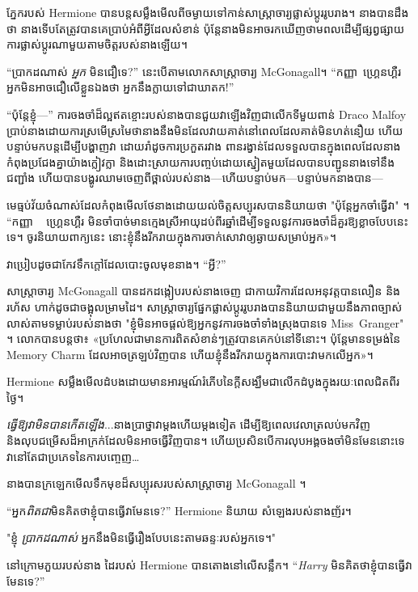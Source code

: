 ភ្នែករបស់ Hermione បានបន្តសម្លឹងមើលពីចម្ងាយទៅកាន់សាស្រ្តាចារ្យផ្លាស់ប្តូររូបរាង។ នាង​បាន​ដឹង​ថា នាង​ទើបតែ​ត្រូវ​បាន​គេ​ប្រាប់​អំពី​អ្វី​ដែល​សំខាន់ ប៉ុន្តែ​នាង​មិន​អាច​រក​ឃើញ​ថាមពល​ដើម្បី​ផ្សព្វផ្សាយ​ការ​ផ្លាស់​ប្តូរ​ណាមួយ​តាម​ចិត្ត​របស់​នាង​ឡើយ។

“ប្រាកដណាស់ \emph{អ្នក} មិនជឿទេ?” នេះ​បើ​តាម​លោក​សាស្ត្រាចារ្យ McGonagall។ “កញ្ញា~ហ្គ្រេនហ្គឺរ អ្នកមិនអាចជឿលើខ្លួនឯងថា អ្នកនឹងក្លាយទៅជាឃាតក!”

“ប៉ុន្តែខ្ញុំ—” ការចងចាំដ៏ល្អឥតខ្ចោះរបស់នាងបានជួយវាឡើងវិញជាលើកទីមួយពាន់ Draco Malfoy ប្រាប់នាងដោយការស្រមើស្រមៃថានាងនឹងមិនដែលវាយគាត់នៅពេលដែលគាត់មិនហត់នឿយ ហើយបន្ទាប់មកបន្តដើម្បីបង្ហាញវា ដោយរាំដូចការប្រកួតរវាង ពាន​រង្វាន់​ដែល​ទទួល​បាន​ក្នុង​ពេល​ដែល​នាង​កំពុង​ប្រជែង​គ្នា​យ៉ាង​ក្លៀវក្លា និង​ដោះស្រាយ​ការ​បញ្ចប់​ដោយ​ស្នៀត​មួយ​ដែល​បាន​បញ្ជូន​នាង​ទៅ​នឹង​ជញ្ជាំង ហើយ​បាន​បង្ហូរ​ឈាម​ចេញ​ពី​ថ្ពាល់​របស់​នាង—ហើយ​បន្ទាប់​មក—បន្ទាប់​មក​នាង​បាន—

មេធ្មប់វ័យចំណាស់ដែលកំពុងមើលថែនាងដោយយល់ចិត្តសប្បុរសបាននិយាយថា "ប៉ុន្តែអ្នកចាំធ្វើវា" ។ “កញ្ញា ~ ហ្គ្រេនហ្គឺរ មិនចាំបាច់មានក្មេងស្រីអាយុដប់ពីរឆ្នាំដើម្បីទទួលនូវការចងចាំដ៏គួរឱ្យខ្លាចបែបនេះទេ។ ចូរ​និយាយ​ពាក្យ​នេះ នោះ​ខ្ញុំ​នឹង​រីក​រាយ​ក្នុង​ការ​ចាក់សោ​វា​ឲ្យ​ឆ្ងាយ​សម្រាប់​អ្នក»។

វា​ប្រៀប​ដូច​ជា​កែវ​ទឹក​ក្តៅ​ដែល​បោះ​ចូល​មុខ​នាង។ “អ្វី?”

សាស្ត្រាចារ្យ McGonagall បានដកដង្កៀបរបស់នាងចេញ ជាកាយវិការដែលអនុវត្តបានលឿន និងរហ័ស ហាក់ដូចជាចង្អុលម្រាមដៃ។ សាស្ត្រាចារ្យផ្នែកផ្លាស់ប្តូររូបរាងបាននិយាយជាមួយនឹងភាពច្បាស់លាស់តាមទម្លាប់របស់នាងថា "ខ្ញុំមិនអាចផ្តល់ឱ្យអ្នកនូវការចងចាំទាំងស្រុងបានទេ Miss~Granger" ។ លោក​បាន​បន្ត​ថា​៖ «​ប្រហែល​ជា​មាន​ការ​ពិត​សំខាន់ៗ​ត្រូវ​បាន​គេ​កប់​នៅ​ទី​នោះ។ ប៉ុន្តែ​មាន​ទម្រង់​នៃ Memory Charm ដែល​អាច​ត្រឡប់​វិញ​បាន ហើយ​ខ្ញុំ​នឹង​រីករាយ​ក្នុង​ការ​បោះ​វា​មក​លើ​អ្នក»។

Hermione សម្លឹងមើលដំបងដោយមានអារម្មណ៍រំភើបនៃក្តីសង្ឃឹមជាលើកដំបូងក្នុងរយៈពេលជិតពីរថ្ងៃ។

\emph{ធ្វើឱ្យវាមិនបានកើតឡើង}...នាងប្រាថ្នាវាម្តងហើយម្តងទៀត ដើម្បីឱ្យពេលវេលាត្រលប់មកវិញ និងលុបជម្រើសដ៏អាក្រក់ដែលមិនអាចធ្វើវិញបាន។ ហើយ​ប្រសិន​បើ​ការ​លុប​អង្គ​ចងចាំ​មិន​មែន​នោះ​ទេ វា​នៅ​តែ​ជា​ប្រភេទ​នៃ​ការ​បញ្ចេញ…

នាងបានក្រឡេកមើលទឹកមុខដ៏សប្បុរសរបស់សាស្រ្តាចារ្យ McGonagall ។

“អ្នក\emph{ពិតជា}មិនគិតថាខ្ញុំបានធ្វើវាមែនទេ?” Hermione និយាយ សំឡេងរបស់នាងញ័រ។

"ខ្ញុំ \emph{ប្រាកដណាស់} អ្នកនឹងមិនធ្វើរឿងបែបនេះតាមឆន្ទៈរបស់អ្នកទេ។"

នៅក្រោមភួយរបស់នាង ដៃរបស់ Hermione បានតោងនៅលើសន្លឹក។ “\emph{Harry} មិនគិតថាខ្ញុំបានធ្វើវាមែនទេ?”

